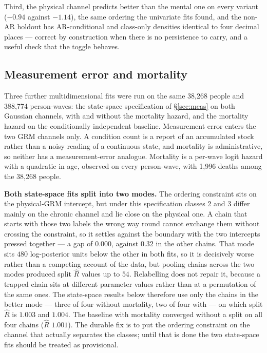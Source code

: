 \documentclass[11pt]{article}
\begin{document}
Third, the physical channel predicts better than the mental one on every
variant ($-0.94$ against $-1.14$), the same ordering the univariate fits
found, and the non-AR holdout has AR-conditional and class-only densities
identical to four decimal places --- correct by construction when there is no
persistence to carry, and a useful check that the toggle behaves.

\subsection*{Measurement error and mortality}
\label{sec:multimort}

Three further multidimensional fits were run on the same 38{,}268 people and
388{,}774 person-waves: the state-space specification of \S\ref{sec:meas} on
both Gaussian channels, with and without the mortality hazard, and the
mortality hazard on the conditionally independent baseline. Measurement error
enters the two GRM channels only. A condition count is a report of an
accumulated stock rather than a noisy reading of a continuous state, and
mortality is administrative, so neither has a measurement-error analogue.
Mortality is a per-wave logit hazard with a quadratic in age, observed on
every person-wave, with 1{,}996 deaths among the 38{,}268 people.

\textbf{Both state-space fits split into two modes.} The ordering constraint
sits on the physical-GRM intercept, but under this specification classes 2
and 3 differ mainly on the chronic channel and lie close on the physical one.
A chain that starts with those two labels the wrong way round cannot exchange
them without crossing the constraint, so it settles against the boundary with
the two intercepts pressed together --- a gap of $0.000$, against $0.32$ in
the other chains. That mode sits $480$ log-posterior units below the other in
both fits, so it is decisively worse rather than a competing account of the
data, but pooling chains across the two modes produced split $\hat R$ values
up to $54$. Relabelling does not repair it, because a trapped chain sits at
different parameter values rather than at a permutation of the same ones. The
state-space results below therefore use only the chains in the better mode ---
three of four without mortality, two of four with --- on which split $\hat R$
is $1.003$ and $1.004$. The baseline with mortality converged without a split
on all four chains ($\hat R$ $1.001$). The durable fix is to put the ordering
constraint on the channel that actually separates the classes; until that is
done the two state-space fits should be treated as provisional.
\end{document}

